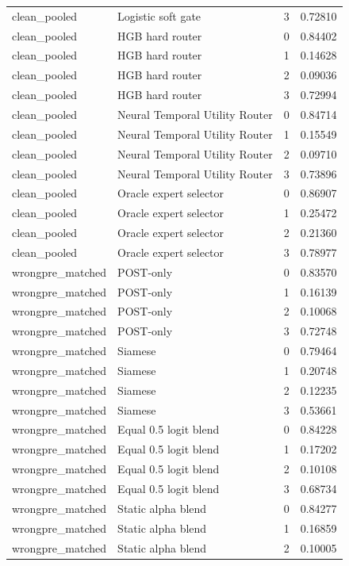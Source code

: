 \begin{tabular}{llrr}
clean\_pooled & Logistic soft gate & 3 & 0.72810 \\
clean\_pooled & HGB hard router & 0 & 0.84402 \\
clean\_pooled & HGB hard router & 1 & 0.14628 \\
clean\_pooled & HGB hard router & 2 & 0.09036 \\
clean\_pooled & HGB hard router & 3 & 0.72994 \\
clean\_pooled & Neural Temporal Utility Router & 0 & 0.84714 \\
clean\_pooled & Neural Temporal Utility Router & 1 & 0.15549 \\
clean\_pooled & Neural Temporal Utility Router & 2 & 0.09710 \\
clean\_pooled & Neural Temporal Utility Router & 3 & 0.73896 \\
clean\_pooled & Oracle expert selector & 0 & 0.86907 \\
clean\_pooled & Oracle expert selector & 1 & 0.25472 \\
clean\_pooled & Oracle expert selector & 2 & 0.21360 \\
clean\_pooled & Oracle expert selector & 3 & 0.78977 \\
wrongpre\_matched & POST-only & 0 & 0.83570 \\
wrongpre\_matched & POST-only & 1 & 0.16139 \\
wrongpre\_matched & POST-only & 2 & 0.10068 \\
wrongpre\_matched & POST-only & 3 & 0.72748 \\
wrongpre\_matched & Siamese & 0 & 0.79464 \\
wrongpre\_matched & Siamese & 1 & 0.20748 \\
wrongpre\_matched & Siamese & 2 & 0.12235 \\
wrongpre\_matched & Siamese & 3 & 0.53661 \\
wrongpre\_matched & Equal 0.5 logit blend & 0 & 0.84228 \\
wrongpre\_matched & Equal 0.5 logit blend & 1 & 0.17202 \\
wrongpre\_matched & Equal 0.5 logit blend & 2 & 0.10108 \\
wrongpre\_matched & Equal 0.5 logit blend & 3 & 0.68734 \\
wrongpre\_matched & Static alpha blend & 0 & 0.84277 \\
wrongpre\_matched & Static alpha blend & 1 & 0.16859 \\
wrongpre\_matched & Static alpha blend & 2 & 0.10005 \\

\end{tabular}

